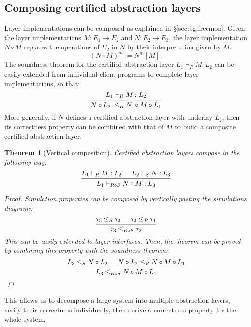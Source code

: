 \documentclass[11pt,oneside,draft]{book}
\newtheorem{theorem}{Theorem}[chapter]
\theoremstyle{definition}
\begin{document}

\subsection{Composing certified abstraction layers} %

Layer implementations can be composed
as explained in \S\ref{sec:bg:freemon}.
Given the layer implementations
$M : E_1 \rightarrow E_2$ and $N : E_2 \rightarrow E_3$,
the layer implementation $N \circ M$
replaces the operations of $E_2$ in $N$
by their interpretation given by $M$:
\[
  (N \circ M)^m := N^m[M]
  \,.
\]
The soundness theorem for the certified abstraction layer
$L_1 \vdash_R M : L_2$
can be easily extended from individual client programs
to complete layer implementations,
so that:
\[
  \begin{prooftree}
    \hypo{L_1 \vdash_R M : L_2}
    \infer1{N \circ L_2 \: \le_R N \: \circ M \circ L_1}
  \end{prooftree}
\]
More generally,
if $N$ defines a certified abstraction layer
with underlay $L_2$,
then its correctness property can be combined with that of $M$
to build a composite certified abstraction layer.

\begin{theorem}[Vertical composition]
Certified abstraction layers compose in the following way:
\[
  \begin{prooftree}
    \hypo{L_1 \vdash_R M : L_2}
    \hypo{L_2 \vdash_S N : L_3}
    \infer2{L_1 \vdash_{R \circ S} N \circ M : L_3}
  \end{prooftree}
\]
\begin{proof}
Simulation properties can be composed
by vertically pasting the simulations diagrams:
\[
  \begin{prooftree}
    \hypo{\tau_3 \le_S \tau_2}
    \hypo{\tau_2 \le_R \tau_1}
    \infer2{\tau_3 \le_{R \circ S} \tau_2}
  \end{prooftree}
\]
This can be easily extended to layer interfaces.
Then,
the theorem can be proved by
 combining this property with the soundness theorem:
\[
  \begin{prooftree}
    \hypo{L_3 \le_S N \circ L_2}
    \hypo{N \circ L_2 \le_R N \circ M \circ L_1}
    \infer2{L_3 \le_{R \circ S} N \circ M \circ L_1}
  \end{prooftree}
\]
\end{proof}
\end{theorem}

This allows us to decompose a large system
into multiple abstraction layers,
verify their correctness individually,
then derive a correctness property for the whole system.
\end{document}
